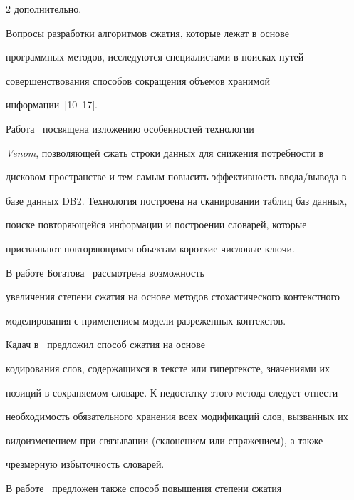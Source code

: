 \begin{multicols}{2}
дополнительно.


     


     Вопросы разработки алгоритмов сжатия, которые лежат в основе 


программных методов, исследуются специалистами в поисках путей 


совершенствования способов сокращения объемов хранимой 


информации~[10--17].


     


     Работа~\cite{1che} посвящена изложению особенностей технологии 


\textit{Venom}, позволяющей сжать строки данных для снижения потребности в 


дисковом пространстве и тем самым повысить эффективность ввода/вывода в 


базе данных DB2. Технология построена на сканировании таблиц баз данных, 


поиске повторяющейся информации и построении словарей, которые 


присваивают повторяющимся объектам короткие числовые ключи.


     


     В работе Богатова~\cite{3che} рассмотрена возможность 


увеличения степени сжатия на основе методов стохастического контекстного 


моделирования с применением модели разреженных контекстов.


     


Кадач в~\cite{5che} предложил способ сжатия на основе 


кодирования слов, содержащихся в тексте или гипертексте, значениями их 


позиций в сохраняемом словаре. К недостатку этого метода следует отнести 


необходимость обязательного хранения всех модификаций слов, вызванных их 


видоизменением при связывании (склонением или спряжением), а также 


чрезмерную избыточность словарей.


     


     В работе~\cite{5che} предложен также способ повышения степени сжатия 



\end{multicols}
